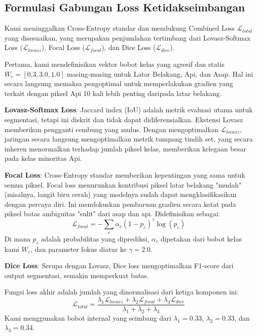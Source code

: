 \documentclass[conference]{IEEEtran}
\begin{document}
\subsection{Formulasi Gabungan Loss Ketidakseimbangan}
Kami meninggalkan Cross-Entropy standar dan mendukung Combined Loss $\mathcal{L}_{total}$ yang disesuaikan, yang merupakan penjumlahan tertimbang dari Lovasz-Softmax Loss ($\mathcal{L}_{lovasz}$), Focal Loss ($\mathcal{L}_{focal}$), dan Dice Loss ($\mathcal{L}_{dice}$). 

Pertama, kami mendefinisikan vektor bobot kelas yang agresif dan statis $W_c = [0.3, 3.0, 1.0]$ masing-masing untuk Latar Belakang, Api, dan Asap. Hal ini secara langsung memaksa pengoptimal untuk memperlakukan gradien yang terkait dengan piksel Api 10 kali lebih penting daripada latar belakang.

\textbf{Lovasz-Softmax Loss}: Jaccard index (IoU) adalah metrik evaluasi utama untuk segmentasi, tetapi ini diskrit dan tidak dapat didiferensialkan. Ekstensi Lovasz memberikan pengganti cembung yang mulus. Dengan mengoptimalkan $\mathcal{L}_{lovasz}$, jaringan secara langsung mengoptimalkan metrik tumpang tindih set, yang secara inheren menormalkan terhadap jumlah piksel kelas, memberikan kelegaan besar pada kelas minoritas Api.

\textbf{Focal Loss}: Cross-Entropy standar memberikan kepentingan yang sama untuk semua piksel. Focal loss menurunkan kontribusi piksel latar belakang "mudah" (misalnya, langit biru cerah) yang modelnya sudah dapat mengklasifikasikan dengan percaya diri. Ini memfokuskan pembaruan gradien secara ketat pada piksel batas ambiguitas "sulit" dari asap dan api. Didefinisikan sebagai:
\begin{equation}
    \mathcal{L}_{focal} = - \sum_{c} \alpha_c (1 - p_c)^\gamma \log(p_c)
\end{equation}
Di mana $p_c$ adalah probabilitas yang diprediksi, $\alpha_c$ dipetakan dari bobot kelas kami $W_c$, dan parameter fokus diatur ke $\gamma = 2.0$.

\textbf{Dice Loss}: Serupa dengan Lovasz, Dice loss mengoptimalkan F1-score dari output segmentasi, semakin memperkuat batas. 

Fungsi loss akhir adalah jumlah yang dinormalisasi dari ketiga komponen ini:
\begin{equation}
    \mathcal{L}_{total} = \frac{\lambda_1 \mathcal{L}_{lovasz} + \lambda_2 \mathcal{L}_{focal} + \lambda_3 \mathcal{L}_{dice}}{\lambda_1 + \lambda_2 + \lambda_3}
\end{equation}
Kami menggunakan bobot internal yang seimbang dari $\lambda_1 = 0.33$, $\lambda_2 = 0.33$, dan $\lambda_3 = 0.34$. 
\end{document}
